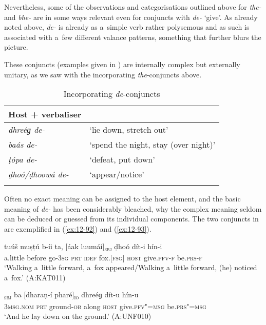Nevertheless, some of the observations and categorisations outlined above for \textit{the-} and \textit{bhe-} are in some ways relevant even for conjuncts with \textit{de-} `give'. As already noted above, \textit{de-} is already as a~simple verb rather polysemous and as such is associated with a~few different valance patterns, something that further blurs the picture.


 These conjuncts (examples given in ) are internally complex but externally unitary, as we saw with the incorporating \textit{the}-conjuncts above. 


\begin{table}[ht]
\caption{Incorporating \textit{de}-conjuncts}
\begin{tabularx}{.75\textwidth}{ l@{\hspace{45pt}} Q }
\lsptoprule
Host + verbaliser &
\\\hline
\textit{dhreéɡ de-} &
`lie down, stretch out'\\
\textit{baás de-} &
`spend the night, stay (over night)'\\
\textit{ṭópa de-} &
`defeat, put down'\\
\textit{ḍhoó/ḍhoowá de-} &
`appear/notice'\\\lspbottomrule
\end{tabularx}
\label{tab:12-7}
\end{table}


Often no exact meaning can be assigned to the host element, and the basic meaning of \textit{de-} has been considerably bleached, why the complex meaning seldom can be deduced or guessed from its individual components. The two conjuncts in  are exemplified in (\ref{ex:12-92}) and (\ref{ex:12-93}).

\begin{exe}
\ex
\label{ex:12-92}
\gll tuúš muṣṭú b-íi ta, [áak luumái]\textsubscript{\textsc{sbj}} ḍhoó dít-i hín-i \\
a.little before go-\textsc{3sg} \textsc{prt} \textsc{idef} fox.[\textsc{fsg]} \textsc{host} give.\textsc{pfv-f} be.\textsc{prs-f} \\
\glt `Walking a~little forward, a~fox appeared/Walking a~little forward, (he) noticed a~fox.' (A:KAT011)
\end{exe}
\begin{exe}
\ex
\label{ex:12-93}
\gll [so]\textsubscript{\textsc{sbj}} ba [dharaṇ-í pharé]\textsubscript{\textsc{io}} dhreéɡ dít-u hín-u \\
\textsc{3msg.nom} \textsc{prt} ground-\textsc{ob} along \textsc{host}  give.\textsc{pfv"=msg} be.\textsc{prs"=msg} \\
\glt `And he lay down on the ground.' (A:UNF010)
\end{exe}

